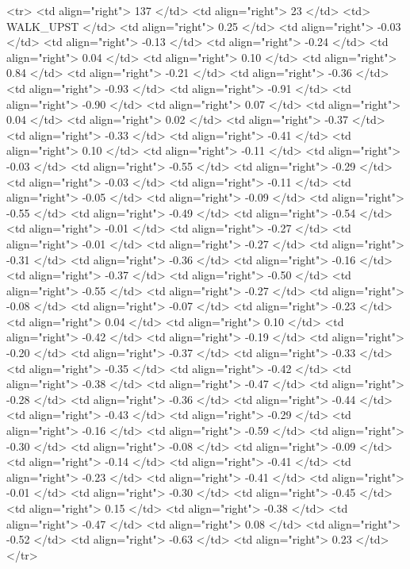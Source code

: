   <tr> <td align="right"> 137 </td> <td align="right">  23 </td> <td> WALK_UPST </td> <td align="right"> 0.25 </td> <td align="right"> -0.03 </td> <td align="right"> -0.13 </td> <td align="right"> -0.24 </td> <td align="right"> 0.04 </td> <td align="right"> 0.10 </td> <td align="right"> 0.84 </td> <td align="right"> -0.21 </td> <td align="right"> -0.36 </td> <td align="right"> -0.93 </td> <td align="right"> -0.91 </td> <td align="right"> -0.90 </td> <td align="right"> 0.07 </td> <td align="right"> 0.04 </td> <td align="right"> 0.02 </td> <td align="right"> -0.37 </td> <td align="right"> -0.33 </td> <td align="right"> -0.41 </td> <td align="right"> 0.10 </td> <td align="right"> -0.11 </td> <td align="right"> -0.03 </td> <td align="right"> -0.55 </td> <td align="right"> -0.29 </td> <td align="right"> -0.03 </td> <td align="right"> -0.11 </td> <td align="right"> -0.05 </td> <td align="right"> -0.09 </td> <td align="right"> -0.55 </td> <td align="right"> -0.49 </td> <td align="right"> -0.54 </td> <td align="right"> -0.01 </td> <td align="right"> -0.27 </td> <td align="right"> -0.01 </td> <td align="right"> -0.27 </td> <td align="right"> -0.31 </td> <td align="right"> -0.36 </td> <td align="right"> -0.16 </td> <td align="right"> -0.37 </td> <td align="right"> -0.50 </td> <td align="right"> -0.55 </td> <td align="right"> -0.27 </td> <td align="right"> -0.08 </td> <td align="right"> -0.07 </td> <td align="right"> -0.23 </td> <td align="right"> 0.04 </td> <td align="right"> 0.10 </td> <td align="right"> -0.42 </td> <td align="right"> -0.19 </td> <td align="right"> -0.20 </td> <td align="right"> -0.37 </td> <td align="right"> -0.33 </td> <td align="right"> -0.35 </td> <td align="right"> -0.42 </td> <td align="right"> -0.38 </td> <td align="right"> -0.47 </td> <td align="right"> -0.28 </td> <td align="right"> -0.36 </td> <td align="right"> -0.44 </td> <td align="right"> -0.43 </td> <td align="right"> -0.29 </td> <td align="right"> -0.16 </td> <td align="right"> -0.59 </td> <td align="right"> -0.30 </td> <td align="right"> -0.08 </td> <td align="right"> -0.09 </td> <td align="right"> -0.14 </td> <td align="right"> -0.41 </td> <td align="right"> -0.23 </td> <td align="right"> -0.41 </td> <td align="right"> -0.01 </td> <td align="right"> -0.30 </td> <td align="right"> -0.45 </td> <td align="right"> 0.15 </td> <td align="right"> -0.38 </td> <td align="right"> -0.47 </td> <td align="right"> 0.08 </td> <td align="right"> -0.52 </td> <td align="right"> -0.63 </td> <td align="right"> 0.23 </td> </tr>
